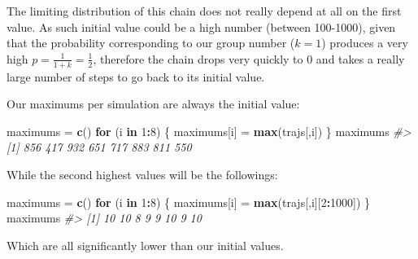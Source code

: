 \documentclass[]{article}
\newenvironment{Shaded}{\begin{snugshade}}{\end{snugshade}}
\newcommand{\CommentTok}[1]{\textcolor[rgb]{0.56,0.35,0.01}{\textit{#1}}}
\newcommand{\ControlFlowTok}[1]{\textcolor[rgb]{0.13,0.29,0.53}{\textbf{#1}}}
\newcommand{\DecValTok}[1]{\textcolor[rgb]{0.00,0.00,0.81}{#1}}
\newcommand{\KeywordTok}[1]{\textcolor[rgb]{0.13,0.29,0.53}{\textbf{#1}}}
\newcommand{\NormalTok}[1]{#1}
\newcommand{\OperatorTok}[1]{\textcolor[rgb]{0.81,0.36,0.00}{\textbf{#1}}}
\newcommand{\StringTok}[1]{\textcolor[rgb]{0.31,0.60,0.02}{#1}}
\begin{document}
The limiting distribution of this chain does not really depend at all on
the first value. As such initial value could be a high number (between
100-1000), given that the probability corresponding to our group number
(\(k=1\)) produces a very high \(p=\frac{1}{1+k} = \frac{1}{2}\),
therefore the chain drops very quickly to 0 and takes a really large
number of steps to go back to its initial value.

Our maximums per simulation are always the initial value:

\begin{Shaded}
\begin{Highlighting}[]
\NormalTok{maximums =}\StringTok{ }\KeywordTok{c}\NormalTok{()}
\ControlFlowTok{for}\NormalTok{ (i }\ControlFlowTok{in} \DecValTok{1}\OperatorTok{:}\DecValTok{8}\NormalTok{) \{}
\NormalTok{    maximums[i] =}\StringTok{ }\KeywordTok{max}\NormalTok{(trajs[,i])}
\NormalTok{\}}
\NormalTok{maximums}
\CommentTok{#> [1] 856 417 932 651 717 883 811 550}
\end{Highlighting}
\end{Shaded}

While the second highest values will be the followings:

\begin{Shaded}
\begin{Highlighting}[]
\NormalTok{maximums =}\StringTok{ }\KeywordTok{c}\NormalTok{()}
\ControlFlowTok{for}\NormalTok{ (i }\ControlFlowTok{in} \DecValTok{1}\OperatorTok{:}\DecValTok{8}\NormalTok{) \{}
\NormalTok{    maximums[i] =}\StringTok{ }\KeywordTok{max}\NormalTok{(trajs[,i][}\DecValTok{2}\OperatorTok{:}\DecValTok{1000}\NormalTok{])}
\NormalTok{\}}
\NormalTok{maximums}
\CommentTok{#> [1] 10 10  8  9  9 10  9 10}
\end{Highlighting}
\end{Shaded}

Which are all significantly lower than our initial values.
\end{document}
